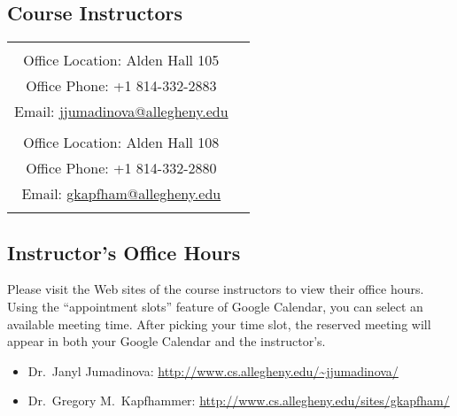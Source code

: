 



\subsection*{Course Instructors}

\begin{tabular}{c c}

\begin{minipage}{4in} 
Dr.\ Janyl Jumadinovaa\\
\noindent Office Location: Alden Hall 105 \\
\noindent Office Phone: +1 814-332-2883 \\
\noindent Email: \url{jjumadinova@allegheny.edu} \\
\end{minipage} &

\begin{minipage}{4in} 
Dr.\ Gregory M.\ Kapfhammer\\ 
\noindent Office Location: Alden Hall 108 \\
\noindent Office Phone: +1 814-332-2880 \\
\noindent Email: \url{gkapfham@allegheny.edu} \\
\end{minipage}  

\end{tabular}
\vspace*{-.3in} 

\subsection*{Instructor's Office Hours}

Please visit the Web sites of the course instructors to view their office hours.  Using the ``appointment slots''
feature of Google Calendar, you can select an available meeting time. After picking your time slot, the reserved meeting
will appear in both your Google Calendar and the instructor's.

\begin{itemize}
	\itemsep 0em
        \item Dr.\ Janyl Jumadinova: \url{http://www.cs.allegheny.edu/~jjumadinova/} 
        \item Dr.\ Gregory M.\ Kapfhammer: \url{http://www.cs.allegheny.edu/sites/gkapfham/}
\end{itemize}

